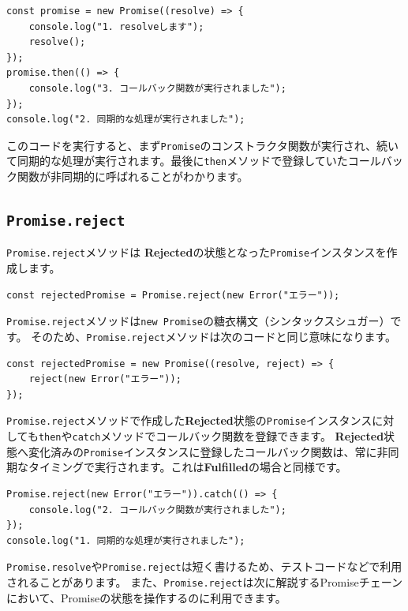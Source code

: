 \begin{lstlisting}
const promise = new Promise((resolve) => {
    console.log("1. resolveします");
    resolve();
});
promise.then(() => {
    console.log("3. コールバック関数が実行されました");
});
console.log("2. 同期的な処理が実行されました");
\end{lstlisting}

このコードを実行すると、まず\texttt{Promise}のコンストラクタ関数が実行され、続いて同期的な処理が実行されます。最後に\texttt{then}メソッドで登録していたコールバック関数が非同期的に呼ばれることがわかります。

\hypertarget{promise-reject}{%
\subsection{\texorpdfstring{\texttt{Promise.reject}}{Promise.reject}}\label{promise-reject}}

\texttt{Promise.reject}メソッドは
\textbf{Rejected}の状態となった\texttt{Promise}インスタンスを作成します。

\begin{lstlisting}
const rejectedPromise = Promise.reject(new Error("エラー"));
\end{lstlisting}

\texttt{Promise.reject}メソッドは\texttt{new Promise}の糖衣構文（シンタックスシュガー）です。
そのため、\texttt{Promise.reject}メソッドは次のコードと同じ意味になります。

\begin{lstlisting}
const rejectedPromise = new Promise((resolve, reject) => {
    reject(new Error("エラー"));
});
\end{lstlisting}

\texttt{Promise.reject}メソッドで作成した\textbf{Rejected}状態の\texttt{Promise}インスタンスに対しても\texttt{then}や\texttt{catch}メソッドでコールバック関数を登録できます。
\textbf{Rejected}状態へ変化済みの\texttt{Promise}インスタンスに登録したコールバック関数は、常に非同期なタイミングで実行されます。これは\textbf{Fulfilled}の場合と同様です。

\begin{lstlisting}
Promise.reject(new Error("エラー")).catch(() => {
    console.log("2. コールバック関数が実行されました");
});
console.log("1. 同期的な処理が実行されました");
\end{lstlisting}

\texttt{Promise.resolve}や\texttt{Promise.reject}は短く書けるため、テストコードなどで利用されることがあります。
また、\texttt{Promise.reject}は次に解説するPromiseチェーンにおいて、Promiseの状態を操作するのに利用できます。

